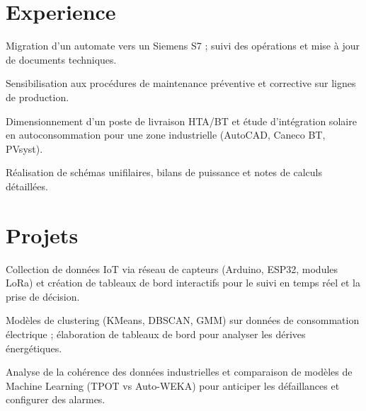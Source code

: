 \documentclass[]{plushcv}
\begin{document}
\begin{minipage}[t]{0.72\textwidth}
\section{Experience}
\hfill{}
\vspace{\topsep} %
\begin{tightemize}
\item Migration d'un automate vers un Siemens S7 ; suivi des opérations et mise à jour de documents techniques.
\item Sensibilisation aux procédures de maintenance préventive et corrective sur lignes de production.
\end{tightemize}
\vspace{\topsep}
\hfill{}
\vspace{\topsep}
\begin{tightemize}
\item Dimensionnement d'un poste de livraison HTA/BT et étude d'intégration solaire en autoconsommation pour une zone industrielle (AutoCAD, Caneco BT, PVsyst).
\item Réalisation de schémas unifilaires, bilans de puissance et notes de calculs détaillées.
\end{tightemize}

\section{Projets}

\vspace{1pt}
\begin{tightemize}
\item Collection de données IoT via réseau de capteurs (Arduino, ESP32, modules LoRa) et création de tableaux de bord interactifs pour le suivi en temps réel et la prise de décision.
\end{tightemize}
\vspace{1pt}
\vspace{1pt}
\begin{tightemize}
\item Modèles de clustering (KMeans, DBSCAN, GMM) sur données de consommation électrique ; élaboration de tableaux de bord pour analyser les dérives énergétiques.
\end{tightemize}
\vspace{1pt}
\vspace{1pt}
\begin{tightemize}
\item Analyse de la cohérence des données industrielles et comparaison de modèles de Machine Learning (TPOT vs Auto-WEKA) pour anticiper les défaillances et configurer des alarmes.
\end{tightemize}
\vspace{1pt}


\end{minipage}
\end{document}

